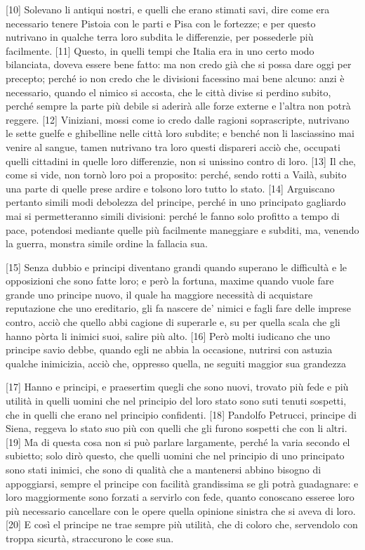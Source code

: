 {[}10{]} Solevano li antiqui nostri, e quelli che erano stimati savi,
dire come era necessario tenere Pistoia con le parti e Pisa con le
fortezze; e per questo nutrivano in qualche terra loro subdita le
differenzie, per possederle più facilmente. {[}11{]} Questo, in quelli
tempi che Italia era in uno certo modo bilanciata, doveva essere bene
fatto: ma non credo già che si possa dare oggi per precepto; perché io
non credo che le divisioni facessino mai bene alcuno: anzi è necessario,
quando el nimico si accosta, che le città divise si perdino subito,
perché sempre la parte più debile si aderirà alle forze externe e
l'altra non potrà reggere.
{[}12{]} Viniziani, mossi come io credo dalle ragioni soprascripte,
nutrivano le sette guelfe e ghibelline nelle città loro subdite; e
benché non li lasciassino mai venire al sangue, tamen nutrivano tra loro
questi dispareri acciò che, occupati quelli cittadini in quelle loro
differenzie, non si unissino contro di loro. {[}13{]} Il che, come si
vide, non tornò loro poi a proposito: perché, sendo rotti a Vailà,
subito una parte di quelle prese ardire e tolsono loro tutto lo stato.
{[}14{]} Arguiscano pertanto simili modi debolezza del principe, perché
in uno principato gagliardo mai si permetteranno simili divisioni:
perché le fanno solo profitto a tempo di pace, potendosi mediante quelle
più facilmente maneggiare e subditi, ma, venendo la guerra, monstra
simile ordine la fallacia sua.

{[}15{]} Senza dubbio e principi diventano grandi quando superano le
difficultà e le opposizioni che sono fatte loro; e però la fortuna,
maxime quando vuole fare grande uno principe nuovo, il quale ha maggiore
necessità di acquistare reputazione che uno ereditario, gli fa nascere
de' nimici e fagli fare delle imprese contro, acciò che quello abbi
cagione di superarle e, su per quella scala che gli hanno pòrta li
inimici suoi, salire più alto. {[}16{]} Però molti iudicano che uno
principe savio debbe, quando egli ne abbia la occasione, nutrirsi con
astuzia qualche inimicizia, acciò che, oppresso quella, ne seguiti
maggior sua grandezza

\quebra

{[}17{]} Hanno e principi, e praesertim quegli che sono nuovi, trovato
più fede e più utilità in quelli uomini che nel principio del loro stato
sono suti tenuti sospetti, che in quelli che erano nel principio
confidenti. {[}18{]} Pandolfo Petrucci, principe di Siena, reggeva lo
stato suo più con quelli che gli furono sospetti che con li altri.
{[}19{]} Ma di questa cosa non si può parlare largamente, perché la
varia secondo el subietto; solo dirò questo, che quelli uomini che nel
principio di uno principato sono stati inimici, che sono di qualità che
a mantenersi abbino bisogno di appoggiarsi, sempre el principe con
facilità grandissima se gli potrà guadagnare: e loro maggiormente sono
forzati a servirlo con fede, quanto conoscano esseree loro più
necessario cancellare con le opere quella opinione sinistra che si aveva
di loro. {[}20{]} E così el principe ne trae sempre più utilità, che di
coloro che, servendolo con troppa sicurtà, straccurono le cose sua.

